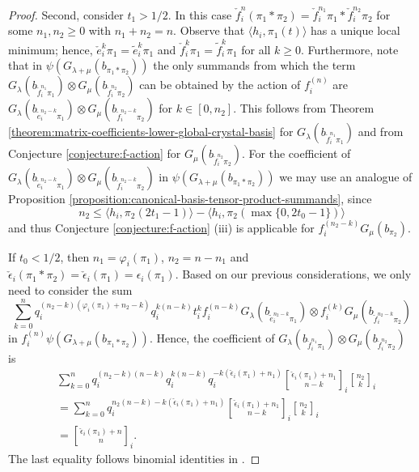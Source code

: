 \documentclass[final]{amsart}
\theoremstyle{plain}
\theoremstyle{definition}
\newcommand{\qbinom}{\genfrac{[}{]}{0pt}{}}
\newcommand{\te}{\tilde e}
\newcommand{\tf}{\tilde f}
\newcommand{\cf}{\check{f}}
\newcommand{\ce}{\check{e}}
\newcommand{\cepsilon}{\check{\epsilon}}
\begin{document}
\begin{proof}
    Second, consider $t_1 > 1/2$.
    In this case $\cf_i^n(\pi_1*\pi_2) = \cf_i^{n_1}\pi_1 * \cf_i^{n_2}\pi_2$ for some $n_1, n_2 \ge 0$ with $n_1+n_2 = n$.
    Observe that $\langle h_i, \pi_1(t)\rangle$ has a unique local minimum; hence, $\ce_i^k\pi_1 = \te_i^k\pi_1$ and $\cf_i^k\pi_1 = \tf_i^k\pi_1$ for all $k \ge 0$.
    Furthermore, note that in $\psi(G_{\lambda+\mu}(b_{\pi_1*\pi_2}))$ the only summands from which the term $G_\lambda(b_{\cf_i^{n_1}\pi_1}) \otimes G_\mu(b_{\cf_i^{n_2}\pi_2})$ can be obtained by the action of $f_i^{(n)}$ are $G_\lambda(b_{\te_i^{n_2-k}\pi_1}) \otimes G_\mu(b_{\cf_i^{n_2-k}\pi_2})$ for $k \in [0, n_2]$.
    This follows from Theorem \ref{theorem:matrix-coefficients-lower-global-crystal-basis} for $G_\lambda(b_{\cf_i^{n_1}\pi_1})$ and from Conjecture \ref{conjecture:f-action} for $G_\mu(b_{\cf_i^{n_2}\pi_2})$.
    For the coefficient of $G_\lambda(b_{\te_i^{n_2-k}\pi_1}) \otimes G_\mu(b_{\cf_i^{n_2-k}\pi_2})$ in $\psi(G_{\lambda+\mu}(b_{\pi_1*\pi_2}))$ we may use an analogue of Proposition \ref{proposition:canonical-basis-tensor-product-summands}, since
    \[
        n_2 \le \langle h_i, \pi_2(2t_1-1)\rangle - \langle h_i, \pi_2(\max\{0, 2t_0-1\})\rangle
    \]
    and thus Conjecture \ref{conjecture:f-action} (iii) is applicable for $f_i^{(n_2-k)} G_\mu(b_{\pi_2})$.

    If $t_0 < 1/2$, then $n_1 = \varphi_i(\pi_1)$, $n_2 = n - n_1$ and $\cepsilon_i(\pi_1*\pi_2) = \cepsilon_i(\pi_1) = \epsilon_i(\pi_1)$.
    Based on our previous considerations, we only need to consider the sum
    \[
        \sum_{k=0}^n q_i^{(n_2-k)(\varphi_i(\pi_1)+n_2-k)} q_i^{k(n-k)} t_i^k f_i^{(n-k)} G_\lambda(b_{\te_i^{n_2-k}\pi_1}) \otimes f_i^{(k)} G_\mu(b_{\cf_i^{n_2-k}\pi_2})
    \]
    in $f_i^{(n)} \psi(G_{\lambda+\mu}(b_{\pi_1*\pi_2}))$.
    Hence, the coefficient of $G_\lambda(b_{\cf_i^{n_1}\pi_1}) \otimes G_\mu(b_{\cf_i^{n_2}\pi_2})$ is
    \begin{align*}
        & \sum_{k=0}^n q_i^{(n_2-k)(n-k)} q_i^{k(n-k)} q_i^{-k(\cepsilon_i(\pi_1)+n_1)} \qbinom{\cepsilon_i(\pi_1)+n_1}{n-k}_i \qbinom{n_2}{k}_i \\
        &= \sum_{k=0}^n q_i^{n_2(n-k) - k(\cepsilon_i(\pi_1)+n_1)} \qbinom{\cepsilon_i(\pi_1)+n_1}{n-k}_i \qbinom{n_2}{k}_i \\
        &= \qbinom{\cepsilon_i(\pi_1)+n}{n}_i.
    \end{align*}
    The last equality follows binomial identities in \cite{Lusztig:IntroductionToQuantumGroups}.


\end{proof}
\end{document}
